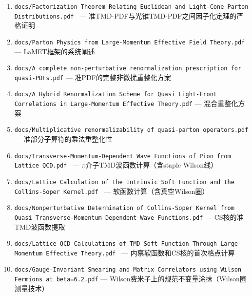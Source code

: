 \documentclass[12pt,a4paper]{ctexart}
\theoremstyle{definition}
\begin{document}
\begin{enumerate}[leftmargin=*,nosep]
    \item \texttt{docs/Factorization Theorem Relating Euclidean and Light-Cone Parton Distributions.pdf}~\cite{Izubuchi2018} — 准TMD-PDF与光锥TMD-PDF之间因子化定理的严格证明
    \item \texttt{docs/Parton Physics from Large-Momentum Effective Field Theory.pdf}~\cite{Ji2014LaMET} — LaMET框架的系统阐述
    \item \texttt{docs/A complete non-perturbative renormalization prescription for quasi-PDFs.pdf} — 准PDF的完整非微扰重整化方案
    \item \texttt{docs/A Hybrid Renormalization Scheme for Quasi Light-Front Correlations in Large-Momentum Effective Theory.pdf} — 混合重整化方案
    \item \texttt{docs/Multiplicative renormalizability of quasi-parton operators.pdf} — 准部分子算符的乘法重整化性
    \item \texttt{docs/Transverse-Momentum-Dependent Wave Functions of Pion from Lattice QCD.pdf}~\cite{Chu2023TMDWF} — $\pi$介子TMD波函数计算（含staple Wilson线）
    \item \texttt{docs/Lattice Calculation of the Intrinsic Soft Function and the Collins-Soper Kernel.pdf}~\cite{Chu2023soft} — 软函数计算（含真空Wilson圈）
    \item \texttt{docs/Nonperturbative Determination of Collins-Soper Kernel from Quasi Transverse-Momentum Dependent Wave Functions.pdf} — CS核的准TMD波函数提取
    \item \texttt{docs/Lattice-QCD Calculations of TMD Soft Function Through Large-Momentum Effective Theory.pdf}~\cite{LPC2020soft} — 内禀软函数和CS核的首次格点计算
    \item \texttt{docs/Gauge-Invariant Smearing and Matrix Correlators using Wilson Fermions at beta=6.2.pdf} — Wilson费米子上的规范不变量涂抹（Wilson圈测量技术）
\end{enumerate}
\end{document}
